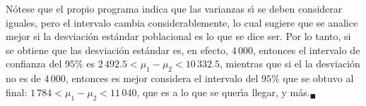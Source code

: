 \begin{solucion}
 \par 
 N\'otese que el propio programa indica que las varianzas s\'{\i} se deben considerar iguales, pero el intervalo cambia considerablemente, lo cual sugiere que se analice mejor si la desviaci\'on est\'andar poblacional es lo que se dice ser. Por lo tanto, si se obtiene que las desviaci\'on est\'andar es, en efecto, $4\,000$, entonces el intervalo de confianza del $95\%$ es $2\,492.5 < \mu_1 - \mu_2 < 10\,332.5$, mientras que si el la desviaci\'on no es de $4\,000$, entonces es mejor considera el intervalo del $95\%$ que se obtuvo al final: $1\,784 < \mu_1 - \mu_2 < 11\,040$, que es a lo que se quer\'{\i}a llegar, y m\'as.${}_{\blacksquare}$
\end{solucion}
